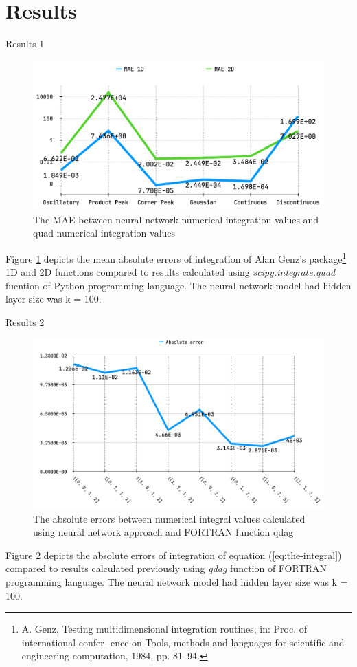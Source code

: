 \documentclass[9pt]{beamer}
\begin{document}
\section{Results}

\begin{frame}{Results 1}

\begin{figure}[h!]
    \centering
    \includegraphics[width=0.7\linewidth]{maes.png}
    \caption{The MAE between neural network numerical integration values and quad numerical integration values}
    \label{fig:maes}
\end{figure}

Figure \ref{fig:maes} depicts the mean absolute errors of integration of Alan Genz's package\footnote{A. Genz, Testing multidimensional integration routines, in: Proc. of international confer-
ence on Tools, methods and languages for scientific and engineering computation, 1984, pp.
81–94.} 1D and 2D functions compared to results calculated using \textit{scipy.integrate.quad} fucntion of Python programming language. The neural network model had hidden layer size was k = 100. 
    
\end{frame}

\begin{frame}{Results 2}

\begin{figure}[h!]
    \centering
    \includegraphics[width=0.7\linewidth]{iaes.png}
    \caption{The absolute errors between numerical integral values calculated using neural network approach and FORTRAN function qdag}
    \label{fig:iaes}
\end{figure}

Figure \ref{fig:iaes} depicts the absolute errors of integration of equation (\ref{eq:the-integral}) compared to results calculated previously using \textit{qdag} function of FORTRAN programming language. The neural network model had hidden layer size was k = 100.
    
\end{frame}
\end{document}
